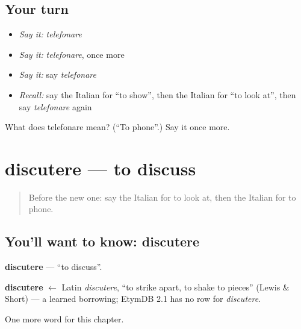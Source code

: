 \subsection*{Your turn}
\begin{itemize}
\raggedright
  \item \emph{Say it:} \emph{telefonare}
  \item \emph{Say it:} \emph{telefonare}, once more
  \item \emph{Say it:} say \emph{telefonare}
  \item \emph{Recall:} say the Italian for \textquotedblleft{}to show\textquotedblright{}, then the Italian for \textquotedblleft{}to look at\textquotedblright{}, then say \emph{telefonare} again
\end{itemize}

\begin{tcolorbox}[breakable,colback=teal!4,colframe=teal!35!black,title={Before you move on}]
What does telefonare mean? (\textquotedblleft{}To phone\textquotedblright{}.) Say it once more.
\end{tcolorbox}
\section[discutere]{discutere — to discuss}

\label{lesson:IT-C143-discutere}



\begin{quote}
Before the new one: say the Italian for to look at, then the Italian for to phone.
\end{quote}

\subsection*{You'll want to know: discutere}
\textbf{discutere} — \textquotedblleft{}to discuss\textquotedblright{}.

\begin{cousinweb}
\textbf{discutere} $\leftarrow$ Latin \emph{discutere}, \textquotedblleft{}to strike apart, to shake to pieces\textquotedblright{} (Lewis \& Short) — a learned borrowing; EtymDB 2.1 has no row for \emph{discutere}.
\end{cousinweb}

\begin{grammarlens}[title={What you've built}]
One more word for this chapter.
\end{grammarlens}

